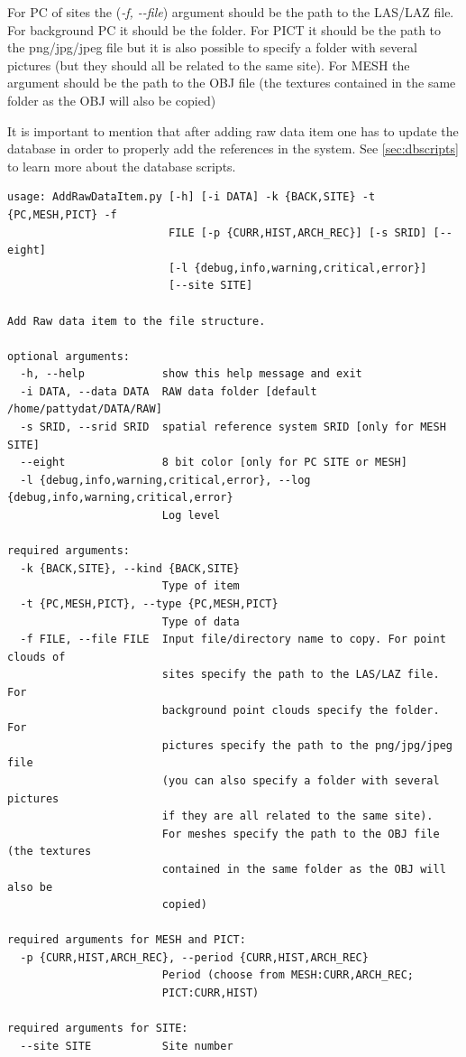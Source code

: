 For PC of sites the (\textit{-f, -\hspace{0cm}-file}) argument should be the path 
to the LAS/LAZ file. For background PC it should be the folder. 
For PICT it should be the path to the png/jpg/jpeg file but it is also possible to specify a folder with several pictures (but they should all be related to the same site).
For MESH the argument should be the path to the OBJ file (the textures contained in the same folder as the OBJ will also be copied)

It is important to mention that after adding raw data item one has to update the database in order to properly add the references in the system. See \ref{sec:dbscripts} to learn more about the database scripts.

\begin{Verbatim}[fontfamily=courier,commandchars=\\\{\},fontsize=\footnotesize]
usage: AddRawDataItem.py [-h] [-i DATA] -k {BACK,SITE} -t {PC,MESH,PICT} -f
                         FILE [-p {CURR,HIST,ARCH_REC}] [-s SRID] [--eight]
                         [-l {debug,info,warning,critical,error}]
                         [--site SITE]

Add Raw data item to the file structure.

optional arguments:
  -h, --help            show this help message and exit
  -i DATA, --data DATA  RAW data folder [default /home/pattydat/DATA/RAW]
  -s SRID, --srid SRID  spatial reference system SRID [only for MESH SITE]
  --eight               8 bit color [only for PC SITE or MESH]
  -l {debug,info,warning,critical,error}, --log {debug,info,warning,critical,error}
                        Log level

required arguments:
  -k {BACK,SITE}, --kind {BACK,SITE}
                        Type of item
  -t {PC,MESH,PICT}, --type {PC,MESH,PICT}
                        Type of data
  -f FILE, --file FILE  Input file/directory name to copy. For point clouds of
                        sites specify the path to the LAS/LAZ file. For
                        background point clouds specify the folder. For
                        pictures specify the path to the png/jpg/jpeg file 
                        (you can also specify a folder with several pictures 
                        if they are all related to the same site). 
                        For meshes specify the path to the OBJ file (the textures
                        contained in the same folder as the OBJ will also be
                        copied)

required arguments for MESH and PICT:
  -p {CURR,HIST,ARCH_REC}, --period {CURR,HIST,ARCH_REC}
                        Period (choose from MESH:CURR,ARCH_REC;
                        PICT:CURR,HIST)

required arguments for SITE:
  --site SITE           Site number
\end{Verbatim}

